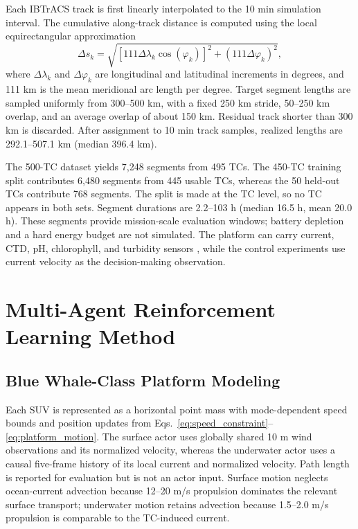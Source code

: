 \documentclass[a4paper,fleqn]{cas-dc}
\begin{document}
Each IBTrACS track is first linearly interpolated to the 10 min simulation
interval. The cumulative along-track distance is computed using the local
equirectangular approximation
\begin{equation}
\Delta s_k =
\sqrt{
\left[
111\Delta\lambda_k\cos(\varphi_k)
\right]^2
+
\left(111\Delta\varphi_k\right)^2
},
\label{eq:segment_distance}
\end{equation}
where $\Delta\lambda_k$ and $\Delta\varphi_k$ are longitudinal and latitudinal
increments in degrees, and 111 km is the mean meridional arc length per degree.
Target segment lengths are sampled uniformly from 300--500 km, with a fixed
250 km stride, 50--250 km overlap, and an average overlap of about 150 km.
Residual track shorter than 300 km is discarded. After assignment to 10 min
track samples, realized lengths are 292.1--507.1 km (median 396.4 km).

The 500-TC dataset yields 7,248 segments from 495 TCs. The 450-TC training split
contributes 6,480 segments from 445 usable TCs, whereas the 50 held-out TCs
contribute 768 segments. The split is made at the TC level, so no TC appears in
both sets. Segment durations are 2.2--103 h (median 16.5 h, mean 20.0 h). These
segments provide mission-scale evaluation windows; battery depletion and a hard
energy budget are not simulated. The platform can carry current, CTD, pH,
chlorophyll, and turbidity sensors \citep{r28}, while the control experiments
use current velocity as the decision-making observation.

\section{Multi-Agent Reinforcement Learning Method}\label{sec:model}

\subsection{Blue Whale-Class Platform Modeling}

Each SUV is represented as a horizontal point mass with mode-dependent speed
bounds and position updates from
Eqs.~\eqref{eq:speed_constraint}--\eqref{eq:platform_motion}. The surface actor
uses globally shared 10 m wind observations and its normalized velocity,
whereas the underwater actor uses a causal five-frame history of its local
current and normalized velocity. Path length is reported for evaluation but is
not an actor input. Surface motion neglects ocean-current advection because
12--20 m/s propulsion dominates the relevant surface transport; underwater
motion retains advection because 1.5--2.0 m/s propulsion is comparable to the
TC-induced current.
\end{document}

